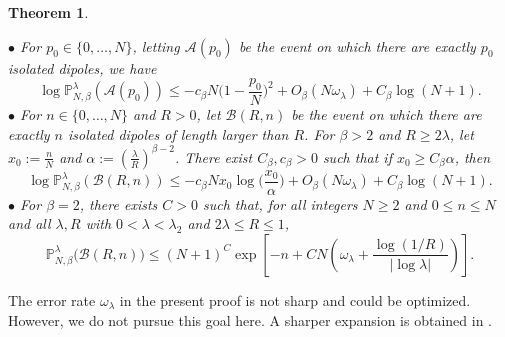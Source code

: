 \documentclass[a4paper,10pt,leqno]{amsart}
\numberwithin{equation}{section}
\newtheorem{theo}{Theorem}
\def\mc{\mathcal}
\def\P{\mathbb{P}_{N,\beta}^{\lambda}}
\begin{document}
\begin{theo}
\begin{enumerate}
    $\bullet$ For $p_0\in\{0,\ldots,N\}$, letting $\mc{A}(p_0)$ be the event on which there are exactly $p_0$ isolated dipoles, we have
    \begin{equation}\label{eq:b1}
      \log \P(\mc{A}(p_0))\leq -c_\beta N \Bigr(1-\frac{p_0}{N}\Bigr)^2+O_\beta(N\omega_\lambda)+C_\beta\log(N+1).
    \end{equation}
    $\bullet$ For $n\in\{0,\ldots,N\}$ and $R>0$, let $\mc{B}(R,n)$ be the event on which there are exactly $n$ isolated dipoles of length larger than $R$. For $\beta>2$ and $R\ge2\lambda$, let $x_0:=\frac{n}{N}$ and $\alpha:=(\frac{\lambda}{R})^{\beta-2}$. There exist $C_\beta,c_\beta>0$ such that if $x_0\geq C_\beta\alpha$, then
    \begin{equation}\label{eq:b2}
      \log \P(\mc{B}(R,n))\leq -c_\beta N x_0\log \Bigr(\frac{x_0}{\alpha}\Bigr)+O_\beta(N\omega_\lambda)+C_\beta\log(N+1).
    \end{equation}
    $\bullet$ For $\beta=2$, there exists $C>0$ such that, for all integers $N\ge2$ and $0\le n\le N$ and all $\lambda,R$ with $0<\lambda<\lambda_2$ and $2\lambda\le R\le1$,
    \begin{equation}\label{eq:critical lengths}
      \P\bigl(\mc B(R,n)\bigr)
      \le (N+1)^C\exp\left[-n+CN\left(\omega_\lambda+
      \frac{\log(1/R)}{|\log\lambda|}\right)\right].
    \end{equation}
  \end{enumerate}
\end{theo}
The error rate $\omega_\lambda$ in the present proof is not sharp and could be optimized. However, we do not pursue this goal here. A sharper expansion is obtained in \cite{BS2}.

\medskip
\end{document}
